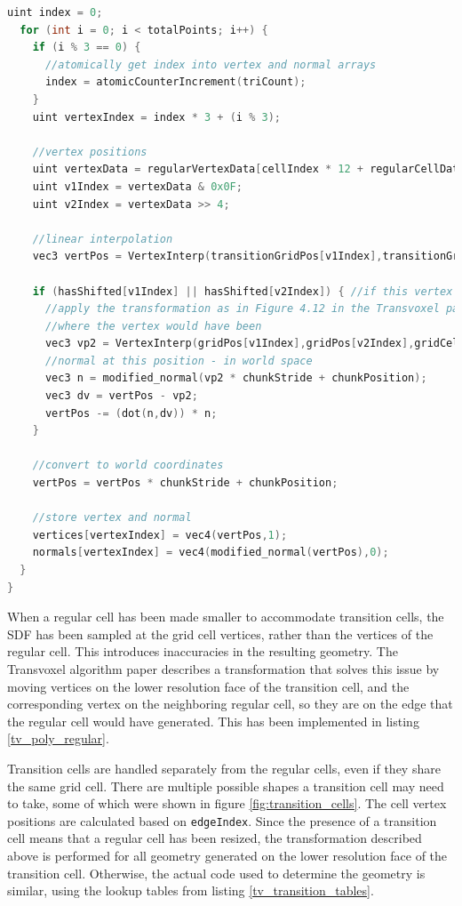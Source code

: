 \documentclass[11pt]{article}
\begin{document}
\begin{enumerate}
\begin{lstlisting}[language=C++,label={tv_poly_regular},caption={Code for generating the geometry in a regular cell.}]
  uint index = 0;
  for (int i = 0; i < totalPoints; i++) {
    if (i % 3 == 0) {
      //atomically get index into vertex and normal arrays
      index = atomicCounterIncrement(triCount);
    }
    uint vertexIndex = index * 3 + (i % 3);

    //vertex positions
    uint vertexData = regularVertexData[cellIndex * 12 + regularCellData[cellClass * 16 + 1+i]];
    uint v1Index = vertexData & 0x0F;
    uint v2Index = vertexData >> 4;

    //linear interpolation
    vec3 vertPos = VertexInterp(transitionGridPos[v1Index],transitionGridPos[v2Index],gridCells[v1Index],gridCells[v2Index]);

    if (hasShifted[v1Index] || hasShifted[v2Index]) { //if this vertex has moved
      //apply the transformation as in Figure 4.12 in the Transvoxel paper
      //where the vertex would have been
      vec3 vp2 = VertexInterp(gridPos[v1Index],gridPos[v2Index],gridCells[v1Index], gridCells[v2Index]);
      //normal at this position - in world space
      vec3 n = modified_normal(vp2 * chunkStride + chunkPosition);
      vec3 dv = vertPos - vp2;
      vertPos -= (dot(n,dv)) * n;
    }

    //convert to world coordinates
    vertPos = vertPos * chunkStride + chunkPosition;

    //store vertex and normal
    vertices[vertexIndex] = vec4(vertPos,1);
    normals[vertexIndex] = vec4(modified_normal(vertPos),0);
  }
}
\end{lstlisting}
When a regular cell has been made smaller to accommodate transition cells, the SDF has been sampled at the grid cell vertices, rather than the vertices of the regular cell. This introduces inaccuracies in the resulting geometry. The Transvoxel algorithm paper describes a transformation that solves this issue by moving vertices on the lower resolution face of the transition cell, and the corresponding vertex on the neighboring regular cell, so they are on the edge that the regular cell would have generated. This has been implemented in listing \ref{tv_poly_regular}.

Transition cells are handled separately from the regular cells, even if they share the same grid cell. There are multiple possible shapes a transition cell may need to take, some of which were shown in figure \ref{fig:transition_cells}. The cell vertex positions are calculated based on \texttt{edgeIndex}. Since the presence of a transition cell means that a regular cell has been resized, the transformation described above is performed for all geometry generated on the lower resolution face of the transition cell. Otherwise, the actual code used to determine the geometry is similar, using the lookup tables from listing \ref{tv_transition_tables}.


\end{enumerate}
\end{document}
